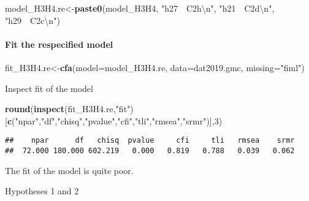\documentclass[
]{article}
\newenvironment{Shaded}{\begin{snugshade}}{\end{snugshade}}
\newcommand{\CharTok}[1]{\textcolor[rgb]{0.31,0.60,0.02}{#1}}
\newcommand{\DataTypeTok}[1]{\textcolor[rgb]{0.13,0.29,0.53}{#1}}
\newcommand{\DecValTok}[1]{\textcolor[rgb]{0.00,0.00,0.81}{#1}}
\newcommand{\KeywordTok}[1]{\textcolor[rgb]{0.13,0.29,0.53}{\textbf{#1}}}
\newcommand{\NormalTok}[1]{#1}
\newcommand{\StringTok}[1]{\textcolor[rgb]{0.31,0.60,0.02}{#1}}
\begin{document}
\begin{Shaded}
\begin{Highlighting}[]
\NormalTok{model_H3H4.re<-}\KeywordTok{paste0}\NormalTok{(model_H3H4,}
                      \StringTok{"h27~~C2h}\CharTok{\textbackslash{}n}\StringTok{"}\NormalTok{,}
                      \StringTok{"h21~~C2d}\CharTok{\textbackslash{}n}\StringTok{"}\NormalTok{,}
                      \StringTok{"h29~~C2c}\CharTok{\textbackslash{}n}\StringTok{"}\NormalTok{)}
\end{Highlighting}
\end{Shaded}

\hypertarget{fit-the-respecified-model-2}{%
\paragraph{Fit the respecified
model}\label{fit-the-respecified-model-2}}

\begin{Shaded}
\begin{Highlighting}[]
\NormalTok{fit_H3H4.re<-}\KeywordTok{cfa}\NormalTok{(}\DataTypeTok{model=}\NormalTok{model_H3H4.re,}
              \DataTypeTok{data=}\NormalTok{dat2019.gmc,}
              \DataTypeTok{missing=}\StringTok{"fiml"}\NormalTok{)}
\end{Highlighting}
\end{Shaded}

Inspect fit of the model

\begin{Shaded}
\begin{Highlighting}[]
\KeywordTok{round}\NormalTok{(}\KeywordTok{inspect}\NormalTok{(fit_H3H4.re,}\StringTok{"fit"}\NormalTok{)}
\NormalTok{      [}\KeywordTok{c}\NormalTok{(}\StringTok{"npar"}\NormalTok{,}\StringTok{"df"}\NormalTok{,}\StringTok{"chisq"}\NormalTok{,}\StringTok{"pvalue"}\NormalTok{,}\StringTok{"cfi"}\NormalTok{,}\StringTok{"tli"}\NormalTok{,}\StringTok{"rmsea"}\NormalTok{,}\StringTok{"srmr"}\NormalTok{)],}\DecValTok{3}\NormalTok{)}
\end{Highlighting}
\end{Shaded}

\begin{verbatim}
##    npar      df   chisq  pvalue     cfi     tli   rmsea    srmr 
##  72.000 180.000 602.219   0.000   0.819   0.788   0.039   0.062
\end{verbatim}

The fit of the model is quite poor.

Hypotheses 1 and 2
\end{document}
